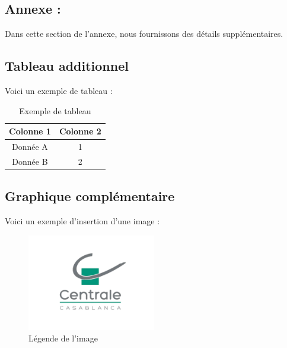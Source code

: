 \documentclass{rapportECC}
\begin{document}
\newpage
\begin{appendices}
\section{Annexe : }
Dans cette section de l'annexe, nous fournissons des détails supplémentaires.

\subsection{Tableau additionnel}
Voici un exemple de tableau :
\begin{table}[h]
    \centering
    \begin{tabular}{|c|c|}
    \hline
    Colonne 1 & Colonne 2 \\
    \hline
    Donnée A & 1 \\
    Donnée B & 2 \\
    \hline
    \end{tabular}
    \caption{Exemple de tableau}
\end{table}

\subsection{Graphique complémentaire}
Voici un exemple d'insertion d'une image :
\begin{figure}[h]
    \centering
    \includegraphics[width=0.5\textwidth]{logos/centrale.png}
    \caption{Légende de l'image}
\end{figure}
\end{appendices}
\end{document}
